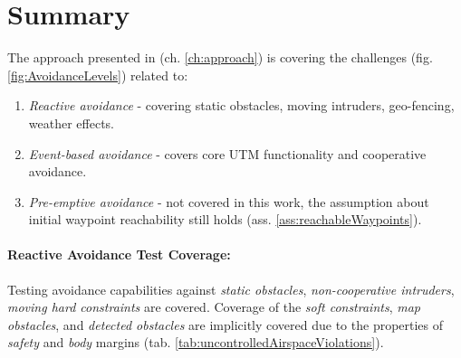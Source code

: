 \section{Summary}\label{s:conclusionSummary}
\noindent The approach presented in (ch. \ref{ch:approach}) is covering the challenges (fig. \ref{fig:AvoidanceLevels}) related to:

\begin{enumerate}
    \item \emph{Reactive avoidance} - covering static obstacles, moving intruders, geo-fencing, weather effects.
    
    \item \emph{Event-based avoidance} - covers core UTM functionality and cooperative avoidance.
    
    \item \emph{Pre-emptive avoidance} - not covered in this work, the assumption about initial waypoint reachability still holds (ass. \ref{ass:reachableWaypoints}).
\end{enumerate}

\paragraph{Reactive Avoidance Test Coverage:} Testing avoidance capabilities against \emph{static obstacles}, \emph{non-cooperative intruders}, \emph{moving hard constraints} are covered. Coverage of the \emph{soft constraints}, \emph{map obstacles}, and \emph{detected obstacles} are implicitly covered due to the properties of \emph{safety} and \emph{body} margins (tab. \ref{tab:uncontrolledAirspaceViolations}).
    
